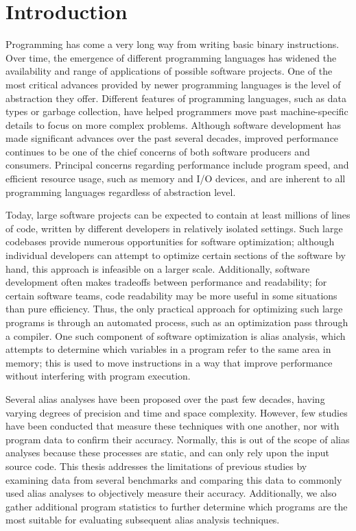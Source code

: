\chapter{Introduction}

Programming has come a very long way from writing basic binary instructions. Over time, the emergence of different programming languages has widened the availability and range of applications of possible software projects. One of the most critical advances provided by newer programming languages is the level of abstraction they offer. Different features of programming languages, such as data types or garbage collection, have helped programmers move past machine-specific details to focus on more complex problems. Although software development has made significant advances over the past several decades, improved performance continues to be one of the chief concerns of both software producers and consumers. Principal concerns regarding performance include program speed, and efficient resource usage, such as memory and I/O devices, and are inherent to all programming languages regardless of abstraction level.

Today, large software projects can be expected to contain at least millions of lines of code\cite{google}, written by different developers in relatively isolated settings. Such large codebases provide numerous opportunities for software optimization; although individual developers can attempt to optimize certain sections of the software by hand, this approach is infeasible on a larger scale. Additionally, software development often makes tradeoffs between performance and readability; for certain software teams, code readability may be more useful in some situations than pure efficiency. Thus, the only practical approach for optimizing such large programs is through an automated process, such as an optimization pass through a compiler. One such component of software optimization is alias analysis, which attempts to determine which variables in a program refer to the same area in memory; this is used to move instructions in a way that improve performance without interfering with program execution.

Several alias analyses have been proposed over the past few decades, having varying degrees of precision and time and space complexity. However, few studies have been conducted that measure these techniques with one another, nor with program data to confirm their accuracy. Normally, this is out of the scope of alias analyses because these processes are static, and can only rely upon the input source code. This thesis addresses the limitations of previous studies by examining data from several benchmarks and comparing this data to commonly used alias analyses to objectively measure their accuracy. Additionally, we also gather additional program statistics to further determine which programs are the most suitable for evaluating subsequent alias analysis techniques.
